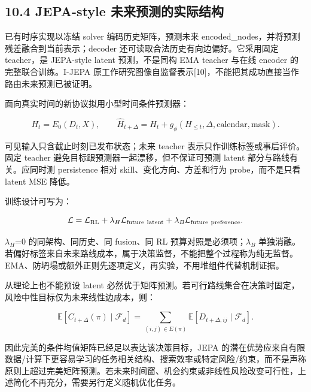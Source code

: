 \documentclass[UTF8,10pt,a4paper,fontset=fandol]{ctexart}
\begin{document}
\subsection*{10.4 JEPA-style 未来预测的实际结构}


已有时序实现以冻结 solver 编码历史矩阵，预测未来 encoded\_\allowbreak{}nodes，并将预测残差融合到当前表示；decoder 还可读取合法历史有向边偏好。它采用固定 teacher，是 JEPA-style latent 预测，不是同构 EMA teacher 与在线 encoder 的完整联合训练。I-JEPA 原工作研究图像自监督表示[10]，不能把其成功直接当作路由未来预测已被证明。


面向真实时间的新协议拟用小型时间条件预测器：


\begin{equation}
H_t=E_0(D_t,X),\qquad
\widehat H_{t+\Delta}=H_t+
g_\phi(H_{\le t},\Delta,\text{calendar},\text{mask}).
\end{equation}

可见输入只含截止时刻已发布状态；未来 teacher 表示只作训练标签或事后评价。固定 teacher 避免目标跟预测器一起漂移，但不保证可预测 latent 部分与路线有关。应同时测 persistence 相对 skill、变化方向、方差和行为 probe，而不是只看 latent MSE 降低。


训练设计可写为：


\begin{equation}
\mathcal L=\mathcal L_{\rm RL}
+\lambda_H\mathcal L_{\rm future\ latent}
+\lambda_B\mathcal L_{\rm future\ preference}.
\end{equation}

\ensuremath{\lambda_{H}}=0 的同架构、同历史、同 fusion、同 RL 预算对照是必须项；\ensuremath{\lambda_{B}} 单独消融。若偏好标签来自未来路线成本，属于决策监督，不能把整个过程称为纯无监督。EMA、防坍塌或额外正则先逐项定义，再实验，不用堆组件代替机制证据。


从理论上也不能预设 latent 必然优于矩阵预测。若可行路线集合在决策时固定，风险中性目标仅为未来线性边成本，则：


\begin{equation}
\mathbb E[C_{t+\Delta}(\pi)\mid\mathcal F_d]
=\sum_{(i,j)\in E(\pi)}
\mathbb E[D_{t+\Delta,ij}\mid\mathcal F_d].
\end{equation}

因此完美的条件均值矩阵已经足以表达该决策目标，JEPA 的潜在优势应来自有限数据/\allowbreak{}计算下更容易学习的任务相关结构、搜索效率或特定风险/\allowbreak{}约束，而不是声称原则上超过完美矩阵预测。若未来时间窗、机会约束或非线性风险改变可行性，上述简化不再充分，需要另行定义随机优化任务。
\end{document}
